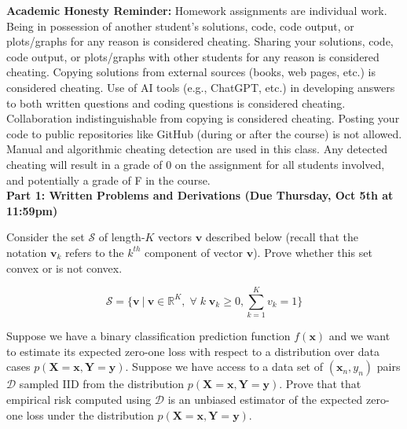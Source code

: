 \documentclass[11pt]{article}
\newcommand{\mbf}[1]{{\mathbf{#1}}}
\begin{document}
\textbf{Academic Honesty Reminder:} Homework assignments are individual work. Being in possession of another student's solutions, code, code output, or plots/graphs for any reason is considered cheating. Sharing your solutions, code, code output, or plots/graphs with other students for any reason is considered cheating. Copying solutions from external sources (books, web pages, etc.) is considered cheating. Use of AI tools (e.g., ChatGPT, etc.) in developing answers to both written questions and coding questions is considered cheating. Collaboration indistinguishable from copying is considered cheating. Posting your code to public repositories like GitHub (during or after the course) is not allowed. Manual and algorithmic cheating detection are used in this class. Any detected cheating will result in a grade of 0 on the assignment for all students involved, and potentially a grade of F in the course. 
\\


\textbf{Part 1: Written Problems and Derivations (Due Thursday, Oct 5th at 11:59pm)}

\begin{problem}{5} Consider the set $\mathcal{S}$ of length-$K$ vectors $\mbf{v}$ described below (recall that the notation $\mbf{v}_k$ refers to the $k^{th}$ component of vector $\mbf{v}$). Prove whether this set convex or is not convex. 

$$\mathcal{S} = \Big\{\mbf{v} ~|~ \mbf{v}\in\mathbb{R}^K,\; \forall\; k \; \mbf{v}_k \geq 0, \sum_{k=1}^Kv_k=1\Big\}$$    
\end{problem}

\begin{problem}{5} Suppose we have a binary classification prediction function $f(\mbf{x})$ and we want to estimate its expected zero-one loss with respect to a distribution over data cases $p(\mbf{X}=\mbf{x},\mbf{Y}=\mbf{y})$. Suppose we have access to a data set of $(\mbf{x}_n,y_n)$ pairs $\mathcal{D}$ sampled IID from the distribution $p(\mbf{X}=\mbf{x},\mbf{Y}=\mbf{y})$. Prove that that empirical risk computed using $\mathcal{D}$ is an unbiased estimator of the expected zero-one loss under the distribution $p(\mbf{X}=\mbf{x},\mbf{Y}=\mbf{y})$.
\end{problem}
\end{document}
